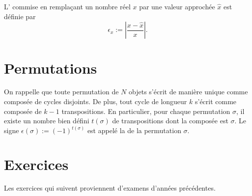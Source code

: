\begin{definition}
	L' commise en remplaçant un nombre réel $x$ par une valeur approchée $\hat{x}$ est définie par 
	\begin{equation}
		\epsilon_x:=\left|\frac{x-\hat{x}}{x}\right|.
	\end{equation}
\end{definition}

\section{Permutations}

On rappelle que toute permutation de $N$ objets s'écrit de manière unique comme composée de cycles disjoints. De plus, tout cycle de longueur $k$ s'écrit comme composée de $k-1$ transpositions. En particulier, pour chaque permutation $\sigma$,  il existe un nombre bien défini $t(\sigma)$ de transpositions dont la composée est $\sigma$. Le signe $\epsilon(\sigma):=(-1)^{t(\sigma)}$ est appelé la  de la permutation $\sigma$.

\section{Exercices}







Les exercices qui suivent proviennent d'examens d'années précédentes.

